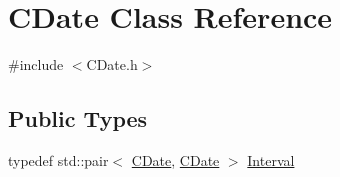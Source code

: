 \hypertarget{class_c_date}{}\section{C\+Date Class Reference}
\label{class_c_date}


{\ttfamily \#include $<$C\+Date.\+h$>$}

\subsection*{Public Types}
\begin{DoxyCompactItemize}
\item 
typedef std\+::pair$<$ \mbox{\hyperlink{class_c_date}{C\+Date}}, \mbox{\hyperlink{class_c_date}{C\+Date}} $>$ \mbox{\hyperlink{class_c_date_af23472c977b14ed341b48183ec19d874}{Interval}}
\end{DoxyCompactItemize}
